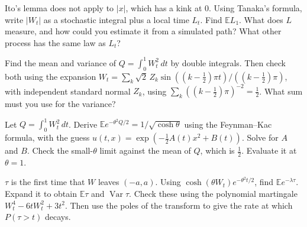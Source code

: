 \begin{question}\label{iq:iv1:stochastic-calculus:27}
Ito's lemma does not apply to $|x|$, which has a kink at 0. Using Tanaka's formula, write $|W_t|$ as a stochastic integral plus a local time $L_t$. Find $\mathbb{E}L_1$. What does $L$ measure, and how could you estimate it from a simulated path? What other process has the same law as $L_t$?
\end{question}

\begin{question}\label{iq:iv1:stochastic-calculus:28}
Find the mean and variance of $Q = \int_0^1W_t^2\,dt$ by double integrals. Then check both using the expansion $W_t = \sum_k\sqrt{2}\,Z_k\sin((k - \frac12)\pi t)/((k - \frac12)\pi)$, with independent standard normal $Z_k$, using $\sum_k((k - \frac12)\pi)^{-2} = \frac12$. What sum must you use for the variance?
\end{question}

\begin{question}\label{iq:iv1:stochastic-calculus:29}
Let $Q = \int_0^1W_t^2\,dt$. Derive $\mathbb{E}e^{-\theta^2Q/2} = 1/\sqrt{\cosh\theta}$ using the Feynman--Kac formula, with the guess $u(t, x) = \exp(-\frac12A(t)x^2 + B(t))$. Solve for $A$ and $B$. Check the small-$\theta$ limit against the mean of $Q$, which is $\frac12$. Evaluate it at $\theta = 1$.
\end{question}

\begin{question}\label{iq:iv1:stochastic-calculus:30}
$\tau$ is the first time that $W$ leaves $(-a, a)$. Using $\cosh(\theta W_t)e^{-\theta^2t/2}$, find $\mathbb{E}e^{-\lambda\tau}$. Expand it to obtain $\mathbb{E}\tau$ and $\operatorname{Var}\tau$. Check these using the polynomial martingale $W_t^4 - 6tW_t^2 + 3t^2$. Then use the poles of the transform to give the rate at which $P(\tau > t)$ decays.
\end{question}
